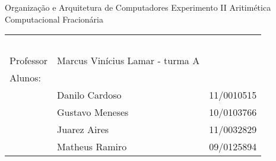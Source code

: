 \documentclass[a4paper,11pt]{article}
\begin{document}
\MakeMyTitlePage
{Organização e Arquitetura de Computadores}
{Experimento II}
{Aritimética Computacional Fracionária}
{%
		\begin{tabular}{llr} \
		& & \\[0.05cm]		
		Professor & Marcus Vinícius Lamar - turma A & \\
		
		Alunos:& & \\
	&	 Danilo Cardoso   			& 11/0010515 \\
	&	 Gustavo Meneses   			& 10/0103766 \\
	&	 Juarez Aires   			& 11/0032829\\ 
	&	 Matheus Ramiro   			& 09/0125894 \\
	[0.05cm]	
		\end{tabular}
}




\end{document}
